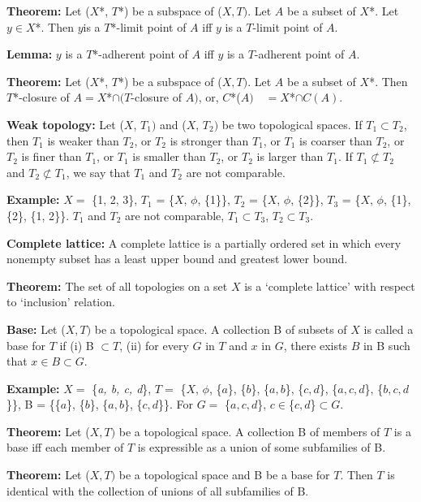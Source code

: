 \documentclass[12pt]{amsart}
\begin{document}
\textbf{Theorem:} Let ($X$*, $T$*) be a subspace of ($X, T)$. Let $A$ be a subset of $X$*. Let 
$y\in X$*. Then $y $is a $T$*-limit point of $A$ iff $y$ is a $T$-limit point of $A$.

\textbf{Lemma:} $y$ is a $T$*-adherent point of $A$ iff $y$ is a $T$-adherent point of $A$.

\textbf{Theorem:} Let ($X$*, $T$*) be a subspace of ($X, T)$. Let $A$ be a subset of $X$*. 
Then $T$*-closure of $A = X$*$\cap (T$-closure of $A)$, or, $C$*($A) \quad = X$*$\cap C(A)$.

\textbf{Weak topology:} Let ($X$, $T_{1})$ and ($X$, $T_{2})$ be two topological 
spaces. If $T_{1}\subset T_{2}$, then $T_{1}$ is weaker than $T_{2}$, or 
$T_{2}$ is stronger than $T_{1}$, or $T_{1}$ is coarser than $T_{2}$, or 
$T_{2}$ is finer than $T_{1}$, or $T_{1}$ is smaller than $T_{2}$, or $T_{2}$ is 
larger than $T_{1}$. If $T_{1}\not\subset T_{2}$ and $T_{2}\not\subset 
T_{1}$, we say that $T_{1}$ and $T_{2}$ are not comparable.

\textbf{Example:} $X =$ {\{}1, 2, 3{\}}, $T_{1}$ = {\{}$X$, $\phi $, {\{}1{\}}{\}}, 
$T_{2}$ = {\{}$X$, $\phi $, {\{}2{\}}{\}}, $T_{3}$ = {\{}$X$, $\phi $, {\{}1{\}}, 
{\{}2{\}}, {\{}1, 2{\}}{\}}. $T_{1}$ and $T_{2}$ are not comparable, 
$T_{1}\subset T_{3}$, $T_{2}\subset T_{3}$.

\textbf{Complete lattice:} A complete lattice is a partially ordered set in 
which every nonempty subset has a least upper bound and greatest lower 
bound.

\textbf{Theorem:} The set of all topologies on a set $X$ is a `complete 
lattice' with respect to `inclusion' relation.

\textbf{Base:} Let ($X, T)$ be a topological space. A collection B of subsets of 
$X$ is called a base for $T$ if (i) B $\subset T$, (ii) for every $G$ in $T$ and $x$ in $G$, 
there exists $B$ in B such that $x\in B\subset G$.

\textbf{Example:} $X =$ {\{}\textit{a, b, c, d}{\}}, $T =$ {\{}$X$, $\phi $, {\{}$a${\}}, {\{}$b${\}}, {\{}$a, b${\}}, 
{\{}$c, d${\}}, {\{}$a, c, d${\}}, {\{}$b, c, d${\}}{\}}, B = {\{}{\{}$a${\}}, {\{}$b${\}}, {\{}$a, b${\}}, 
{\{}$c, d${\}}{\}}. For $G =$ {\{}$a, c, d${\}}, $c\in ${\{}$c, d${\}}$\subset G$.

\textbf{Theorem:} Let ($X, T)$ be a topological space. A collection B of members 
of $T$ is a base iff each member of $T$ is expressible as a union of some 
subfamilies of B$.$

\textbf{Theorem:} Let ($X, T)$ be a topological space and B be a base for $T$. Then 
$T$ is identical with the collection of unions of all subfamilies of B.
\end{document}
